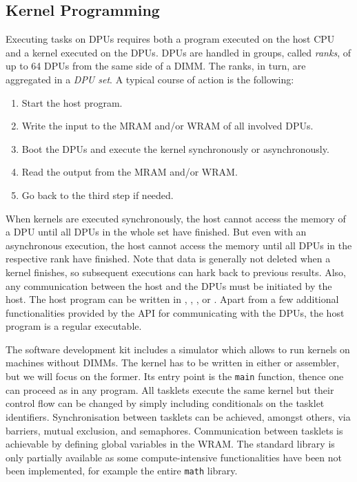 \subsection{Kernel Programming}
\label{sec:prereq:arch:code}

Executing tasks on \acp{DPU} requires both a program executed on the host \ac{CPU} and a kernel executed on the \acp{DPU}.
\Acp{DPU} are handled in groups, called \emph{ranks}, of up to 64 \acp{DPU} from the same side of a \ac{DIMM}.
The ranks, in turn, are aggregated in a \emph{\ac{DPU} set}.
A typical course of action is the following:
\begin{enumerate}
	\item
	Start the host program.

	\item
	Write the input to the \ac{MRAM} and/or \ac{WRAM} of all involved \acp{DPU}.

	\item
	Boot the \acp{DPU} and execute the kernel synchronously or asynchronously.

	\item
	Read the output from the \ac{MRAM} and/or \ac{WRAM}.

	\item
	Go back to the third step if needed.
\end{enumerate}
When kernels are executed synchronously, the host cannot access the memory of a \ac{DPU} until all \acp{DPU} in the whole set have finished.
But even with an asynchronous execution, the host cannot access the memory until all \acp{DPU} in the respective rank have finished.
Note that data is generally not deleted when a kernel finishes, so subsequent executions can hark back to previous results.
Also, any communication between the host and the \acp{DPU} must be initiated by the host.
The host program can be written in \langC{}, \langCpp{}, \langJava{}, or \langPython{}.
Apart from a few additional functionalities provided by the \upmem{} \ac{API} for communicating with the \acp{DPU}, the host program is a regular executable.

The software development kit includes a simulator which allows to run kernels on machines without \upmem{} \acp{DIMM}.
The kernel has to be written in either \langC{} or assembler, but we will focus on the former.
Its entry point is the \lstinline|main| function, thence one can proceed as in any \langC{} program.
All tasklets execute the same kernel but their control flow can be changed by simply including conditionals on the tasklet identifiers.
Synchronisation between tasklets can be achieved, amongst others, via barriers, mutual exclusion, and semaphores.
Communication between tasklets is achievable by defining global variables in the \ac{WRAM}.
The \langC{} standard library is only partially available as some compute-intensive functionalities have been not been implemented, for example the entire \lstinline|math| library.

